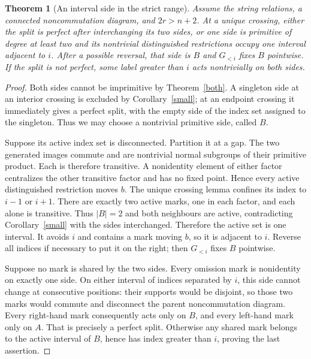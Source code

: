 \documentclass[11pt,a4paper]{article}
\newtheorem{theorem}[lemma]{Theorem}
\begin{document}
\begin{theorem}[An interval side in the strict range]\label{orientation}
Assume the string relations, a connected noncommutation
diagram, and $2r>n+2$. At a unique crossing, either the split
is perfect after interchanging its two sides, or one side
is primitive of degree at least two and its nontrivial
distinguished restrictions occupy one interval adjacent
to $i$. After a possible reversal, that side is $B$ and
$G_{<i}$ fixes $B$ pointwise. If the split is not perfect,
some label greater than $i$ acts nontrivially on both sides.
\end{theorem}
\begin{proof}
Both sides cannot be imprimitive by Theorem~\ref{both}.
A singleton side at an interior crossing is excluded by
Corollary~\ref{small}; at an endpoint crossing it immediately
gives a perfect split, with the empty side of the index set
assigned to the singleton. Thus we may choose a nontrivial
primitive side, called $B$.

Suppose its active index set is disconnected. Partition it
at a gap. The two generated images commute and are nontrivial
normal subgroups of their primitive product. Each is therefore
transitive. A nonidentity element of either factor centralizes
the other transitive factor and has no fixed point. Hence
every active distinguished restriction moves $b$. The unique
crossing lemma confines its index to $i-1$ or $i+1$.
There are exactly two active marks, one in each factor,
and each alone is transitive. Thus $|B|=2$ and both neighbours
are active, contradicting Corollary~\ref{small} with the
sides interchanged. Therefore the active set is one interval.
It avoids $i$ and contains a mark moving $b$, so it is
adjacent to $i$. Reverse all indices if necessary to put
it on the right; then $G_{<i}$ fixes $B$ pointwise.

Suppose no mark is shared by the two sides. Every omission
mark is nonidentity on exactly one side. On either interval
of indices separated by $i$, this side cannot change at
consecutive positions: their supports would be disjoint,
so those two marks would commute and disconnect the parent
noncommutation diagram. Every right-hand mark consequently
acts only on $B$, and every left-hand mark only on $A$.
That is precisely a perfect split. Otherwise any shared
mark belongs to the active interval of $B$, hence has
index greater than $i$, proving the last assertion.
\end{proof}
\end{document}
